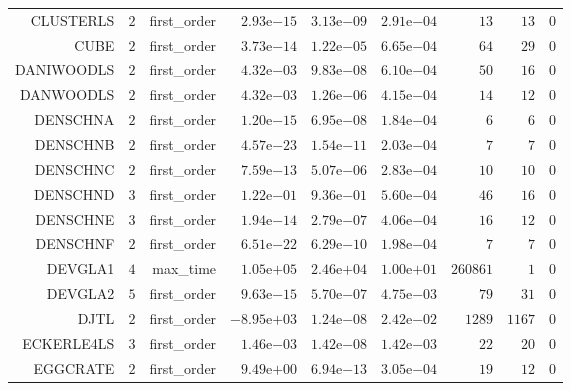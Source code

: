\begin{longtable}{rrrrrrrrr}
CLUSTERLS & \(     2\) & first\_order & \( 2.93\)e\(-15\) & \( 3.13\)e\(-09\) & \( 2.91\)e\(-04\) & \(    13\) & \(    13\) & \(     0\) \\
CUBE & \(     2\) & first\_order & \( 3.73\)e\(-14\) & \( 1.22\)e\(-05\) & \( 6.65\)e\(-04\) & \(    64\) & \(    29\) & \(     0\) \\
DANIWOODLS & \(     2\) & first\_order & \( 4.32\)e\(-03\) & \( 9.83\)e\(-08\) & \( 6.10\)e\(-04\) & \(    50\) & \(    16\) & \(     0\) \\
DANWOODLS & \(     2\) & first\_order & \( 4.32\)e\(-03\) & \( 1.26\)e\(-06\) & \( 4.15\)e\(-04\) & \(    14\) & \(    12\) & \(     0\) \\
DENSCHNA & \(     2\) & first\_order & \( 1.20\)e\(-15\) & \( 6.95\)e\(-08\) & \( 1.84\)e\(-04\) & \(     6\) & \(     6\) & \(     0\) \\
DENSCHNB & \(     2\) & first\_order & \( 4.57\)e\(-23\) & \( 1.54\)e\(-11\) & \( 2.03\)e\(-04\) & \(     7\) & \(     7\) & \(     0\) \\
DENSCHNC & \(     2\) & first\_order & \( 7.59\)e\(-13\) & \( 5.07\)e\(-06\) & \( 2.83\)e\(-04\) & \(    10\) & \(    10\) & \(     0\) \\
DENSCHND & \(     3\) & first\_order & \( 1.22\)e\(-01\) & \( 9.36\)e\(-01\) & \( 5.60\)e\(-04\) & \(    46\) & \(    16\) & \(     0\) \\
DENSCHNE & \(     3\) & first\_order & \( 1.94\)e\(-14\) & \( 2.79\)e\(-07\) & \( 4.06\)e\(-04\) & \(    16\) & \(    12\) & \(     0\) \\
DENSCHNF & \(     2\) & first\_order & \( 6.51\)e\(-22\) & \( 6.29\)e\(-10\) & \( 1.98\)e\(-04\) & \(     7\) & \(     7\) & \(     0\) \\
DEVGLA1 & \(     4\) & max\_time & \( 1.05\)e\(+05\) & \( 2.46\)e\(+04\) & \( 1.00\)e\(+01\) & \(260861\) & \(     1\) & \(     0\) \\
DEVGLA2 & \(     5\) & first\_order & \( 9.63\)e\(-15\) & \( 5.70\)e\(-07\) & \( 4.75\)e\(-03\) & \(    79\) & \(    31\) & \(     0\) \\
DJTL & \(     2\) & first\_order & \(-8.95\)e\(+03\) & \( 1.24\)e\(-08\) & \( 2.42\)e\(-02\) & \(  1289\) & \(  1167\) & \(     0\) \\
ECKERLE4LS & \(     3\) & first\_order & \( 1.46\)e\(-03\) & \( 1.42\)e\(-08\) & \( 1.42\)e\(-03\) & \(    22\) & \(    20\) & \(     0\) \\
EGGCRATE & \(     2\) & first\_order & \( 9.49\)e\(+00\) & \( 6.94\)e\(-13\) & \( 3.05\)e\(-04\) & \(    19\) & \(    12\) & \(     0\) \\

\end{longtable}
